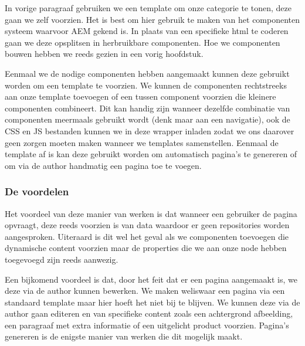     \par
    In vorige paragraaf gebruiken we een template om onze categorie te tonen, deze gaan we zelf voorzien. Het is best om hier gebruik te maken van het componenten systeem waarvoor AEM gekend is. In plaats van een specifieke html te coderen gaan we deze opsplitsen in herbruikbare componenten. Hoe we componenten bouwen hebben we reeds gezien in een vorig hoofdstuk.
    \par
    Eenmaal we de nodige componenten hebben aangemaakt kunnen deze gebruikt worden om een template te voorzien. We kunnen de componenten rechtstreeks aan onze template toevoegen of een tussen component voorzien die kleinere componenten combineert. Dit kan handig zijn wanneer dezelfde combinatie van componenten meermaals gebruikt wordt (denk maar aan een navigatie), ook de CSS en JS bestanden kunnen we in deze wrapper inladen zodat we ons daarover geen zorgen moeten maken wanneer we templates samenstellen. Eenmaal de template af is kan deze gebruikt worden om automatisch pagina's te genereren of om via de author handmatig een pagina toe te voegen.
	\subsubsection{De voordelen}
    Het voordeel van deze manier van werken is dat wanneer een gebruiker de pagina opvraagt, deze reeds voorzien is van data waardoor er geen repositories worden aangesproken. Uiteraard is dit wel het geval als we componenten toevoegen die dynamische content voorzien maar de properties die we aan onze node hebben toegevoegd zijn reeds aanwezig.
    \par
     Een bijkomend voordeel is dat, door het feit dat er een pagina aangemaakt is, we deze via de author kunnen bewerken. We maken weliswaar een pagina via een standaard template maar hier hoeft het niet bij te blijven. We kunnen deze via de author gaan editeren en van specifieke content zoals een achtergrond afbeelding, een paragraaf met extra informatie of een uitgelicht product voorzien. Pagina's genereren is de enigste manier van werken die dit mogelijk maakt.
